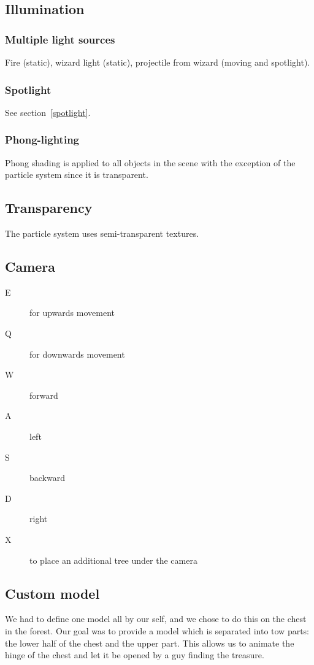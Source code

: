 \subsection{Illumination} \label{subsec:Illumination}

\subsubsection*{Multiple light sources}
Fire (static), wizard light (static), projectile from wizard (moving and spotlight). \label{spotlight}

\subsubsection*{Spotlight}
See section~\ref{spotlight}.

\subsubsection*{Phong-lighting}
Phong shading is applied to all objects in the scene with the exception of the particle system since it is transparent.

\subsection{Transparency} \label{subsec:transparency}
The particle system uses semi-transparent textures.

\subsection{Camera} \label{subsec:camera}
\begin{description}
	\item[E] for upwards movement
	\item[Q] for downwards movement
	\item[W] forward
	\item[A] left
	\item[S] backward
	\item[D] right
	\item[X] to place an additional tree under the camera
\end{description}

\subsection{Custom model} \label{subsec:customModel}
We had to define one model all by our self, and we chose to do this on the chest in the forest.
Our goal was to provide a model which is separated into tow parts: the lower half of the chest and the upper part.
This allows us to animate the hinge of the chest and let it be opened by a guy finding the treasure.


